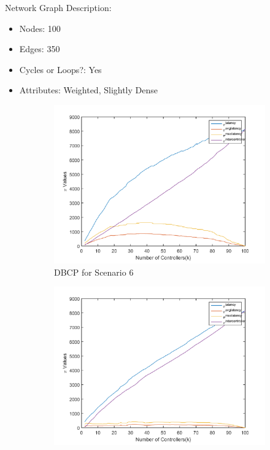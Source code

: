 \documentclass[10pt]{extarticle}
\begin{document}
	Network Graph Description:
	\begin{itemize}
		\item Nodes: 100
		\item Edges: 350
		\item Cycles or Loops?: Yes
		\item Attributes: Weighted, Slightly Dense
	\end{itemize}
	\begin{figure}
		\begin{subfigure}{0.5\linewidth}
			\includegraphics[width=\linewidth]{dbcp_6.png}
			\caption{DBCP for Scenario 6}
			\label{fig:dbcp6}
		\end{subfigure}
		\begin{subfigure}{0.5\linewidth}
			\includegraphics[width=\linewidth]{wdbcp_6.png}

\end{subfigure}
\end{figure}
\end{document}
